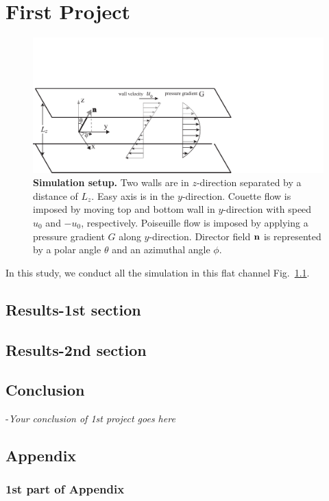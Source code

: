 \chapter{First Project}
\label{sec-crystals}


\begin{figure}[!h]
	\centering
	\includegraphics[width=1.0\linewidth]{images/Result1/figure1_setup.pdf}
	\caption{ {\bf Simulation setup.} Two walls are in $z$-direction separated by a distance of \emph{$L_z$}. Easy axis is in the $y$-direction. Couette flow is imposed by moving top and bottom wall in $y$-direction with speed $u_0$ and $-u_0$, respectively. Poiseuille flow is imposed by applying a pressure gradient \emph{$G$} along $y$-direction. Director field ${\bf n}$ is represented by a polar angle $\theta$ and an azimuthal angle $\phi$.}
	\label{fig2:setup}
\end{figure}


In this study, we conduct all the simulation in this flat channel Fig.~\ref{fig2:setup}. 


\section{Results-1st section}


\newpage
\section{Results-2nd section}

\newpage
\section{Conclusion}

-{\it Your conclusion of 1st project goes here}


\newpage

\section{Appendix}
\label{sec.appen}

\subsection{1st part of Appendix}
\label{appen_Leslie}